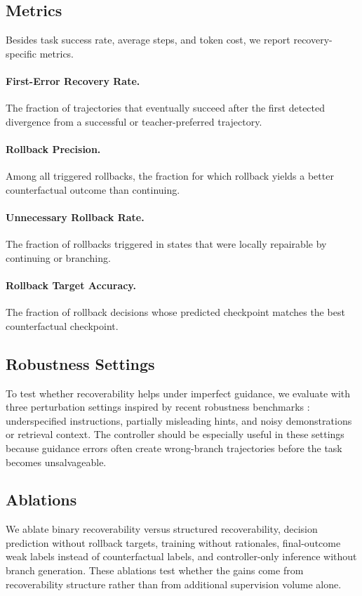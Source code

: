\documentclass[11pt]{article}
\begin{document}
\subsection{Metrics}
Besides task success rate, average steps, and token cost, we report recovery-specific metrics.
\paragraph{First-Error Recovery Rate.}
The fraction of trajectories that eventually succeed after the first detected divergence from a successful or teacher-preferred trajectory.
\paragraph{Rollback Precision.}
Among all triggered rollbacks, the fraction for which rollback yields a better counterfactual outcome than continuing.
\paragraph{Unnecessary Rollback Rate.}
The fraction of rollbacks triggered in states that were locally repairable by continuing or branching.
\paragraph{Rollback Target Accuracy.}
The fraction of rollback decisions whose predicted checkpoint matches the best counterfactual checkpoint.

\subsection{Robustness Settings}
To test whether recoverability helps under imperfect guidance, we evaluate with three perturbation settings inspired by recent robustness benchmarks \citep{diao-etal-2025-guidebench,fu-etal-2026-beyond}: underspecified instructions, partially misleading hints, and noisy demonstrations or retrieval context. The controller should be especially useful in these settings because guidance errors often create wrong-branch trajectories before the task becomes unsalvageable.

\subsection{Ablations}
We ablate binary recoverability versus structured recoverability, decision prediction without rollback targets, training without rationales, final-outcome weak labels instead of counterfactual labels, and controller-only inference without branch generation. These ablations test whether the gains come from recoverability structure rather than from additional supervision volume alone.
\end{document}
